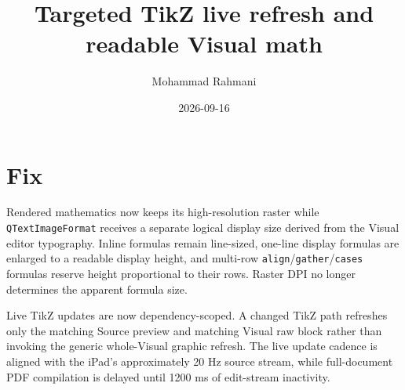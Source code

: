 \documentclass[a4paper]{article}
\title{Targeted TikZ live refresh and readable Visual math}
\date{2026-09-16}
\author{Mohammad Rahmani}
\begin{document}
\maketitle

\section{Fix}
Rendered mathematics now keeps its high-resolution raster while
\texttt{QTextImageFormat} receives a separate logical display size derived from
the Visual editor typography.  Inline formulas remain line-sized, one-line
display formulas are enlarged to a readable display height, and multi-row
\texttt{align}/\texttt{gather}/\texttt{cases} formulas reserve height
proportional to their rows.  Raster DPI no longer determines the apparent
formula size.

Live TikZ updates are now dependency-scoped.  A changed TikZ path refreshes only
the matching Source preview and matching Visual raw block rather than invoking
the generic whole-Visual graphic refresh.  The live update cadence is aligned
with the iPad's approximately 20 Hz source stream, while full-document PDF
compilation is delayed until 1200 ms of edit-stream inactivity.
\end{document}
